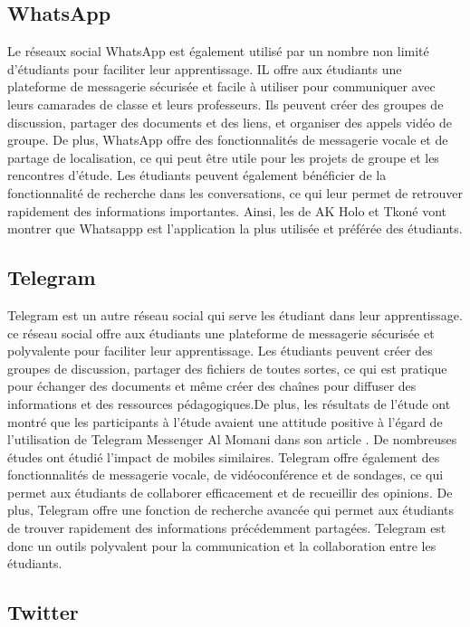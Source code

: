 \documentclass[12pt,a4paper,titlepage]{article}
\begin{document}
\subsection{WhatsApp}
Le réseaux social WhatsApp est également utilisé par un nombre non limité d’étudiants pour faciliter leur apprentissage. IL offre aux étudiants une plateforme de messagerie sécurisée et facile à utiliser pour communiquer avec leurs camarades de classe et leurs professeurs. Ils peuvent créer des groupes de discussion, partager des documents et des liens, et organiser des appels vidéo de groupe. De plus, WhatsApp offre des fonctionnalités de messagerie vocale et de partage de localisation, ce qui peut être utile pour les projets de groupe et les rencontres d'étude. Les étudiants peuvent également bénéficier de la fonctionnalité de recherche dans les conversations, ce qui leur permet de retrouver rapidement des informations importantes. Ainsi, les  de AK Holo  et Tkoné \citep{holo2022usages} vont montrer que Whatsappp est l'application la plus utilisée et préférée des étudiants.
\subsection{Telegram}
Telegram est un autre réseau social qui serve les étudiant dans leur apprentissage. ce réseau social offre aux étudiants une plateforme de messagerie sécurisée et polyvalente pour faciliter leur apprentissage. Les étudiants peuvent créer des groupes de discussion, partager des fichiers de toutes sortes, ce qui est pratique pour échanger des documents  et même créer des chaînes pour diffuser des informations et des ressources pédagogiques.De plus, les résultats de l'étude ont montré que les participants à l'étude avaient une attitude positive à l'égard de l'utilisation de Telegram Messenger Al Momani dans son article \citep{al2020efficacité}. De nombreuses études ont étudié l'impact de mobiles similaires. Telegram offre également des fonctionnalités de messagerie vocale, de vidéoconférence et de sondages, ce qui permet aux étudiants de collaborer efficacement et de recueillir des opinions. De plus, Telegram offre une fonction de recherche avancée qui permet aux étudiants de trouver rapidement des informations précédemment partagées. Telegram est donc un outils polyvalent pour la communication et la collaboration entre les étudiants.

\subsection{Twitter }
\end{document}
